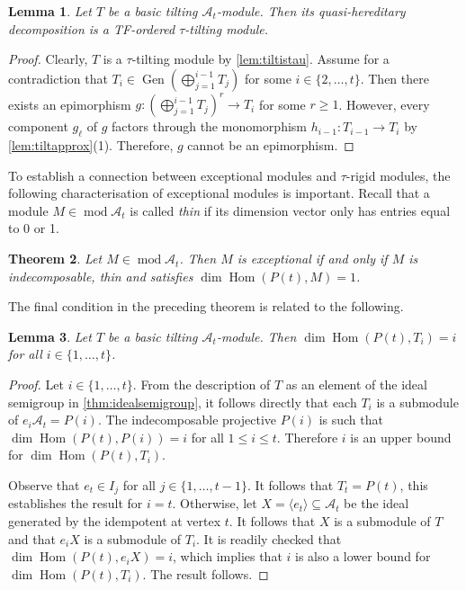 \documentclass[10pt,twoside, a4paper,reqno]{amsart}
\DeclareMathOperator{\mods}{mod}
\DeclareMathOperator{\Hom}{Hom}
\DeclareMathOperator{\Gen}{Gen}
\newcommand{\A}{\mathscr{A}}
\newtheorem{theorem}{Theorem}[section]
\newtheorem{lemma}[theorem]{Lemma}
\theoremstyle{definition}
\begin{document}
\begin{lemma}\label{lem:tfordered}
    Let $T$ be a basic tilting $\A_t$-module. Then its quasi-hereditary decomposition is a TF-ordered $\tau$-tilting module.
\end{lemma}
\begin{proof}
	Clearly, $T$ is a $\tau$-tilting module by \cref{lem:tiltistau}. Assume for a contradiction that $T_i \in \Gen(\bigoplus_{j=1}^{i-1} T_j)$ for some $i \in \{2, \dots, t\}$. Then there exists an epimorphism $g: (\bigoplus_{j=1}^{i-1} T_j)^r \to T_i$ for some $r \geq 1$. However, every component $g_\ell$ of $g$ factors through the monomorphism $h_{i-1}: T_{i-1} \to T_i$ by \cref{lem:tiltapprox}(1). Therefore, $g$ cannot be an epimorphism. 
\end{proof}

To establish a connection between exceptional modules and $\tau$-rigid modules, the following characterisation of exceptional modules is important. Recall that a module $M \in \mods \A_t$ is called \textit{thin} if its dimension vector only has entries equal to 0 or 1. 

\begin{theorem}\cite[Thm. 2.2(1)]{HillePloog2019}\label{thm:HPcharexceptional}
	Let $M \in \mods \A_t$. Then $M$ is exceptional if and only if $M$ is indecomposable, thin and satisfies $\dim \Hom(P(t),M)=1$.
\end{theorem}

The final condition in the preceding theorem is related to the following.

\begin{lemma}\label{lem:tiltdimhom}
    Let $T$ be a basic tilting $\A_t$-module. Then $\dim \Hom(P(t), T_i)=i$ for all $i \in \{1, \dots, t\}$. 
\end{lemma}
\begin{proof}
    Let $i \in \{1, \dots, t\}$. From the description of $T$ as an element of the ideal semigroup in \cref{thm:idealsemigroup}, it follows directly that each $T_i$ is a submodule of $e_i \A_t = P(i)$. The indecomposable projective $P(i)$ is such that $\dim \Hom(P(t), P(i))=i$ for all $1 \leq i \leq t$. Therefore $i$ is an upper bound for $\dim \Hom(P(t), T_i)$. 

    Observe that $e_t \in I_j$ for all $j \in \{1, \dots, t-1\}$. It follows that $T_t = P(t)$, this establishes the result for $i=t$. Otherwise, let $X = \langle e_t \rangle \subseteq \A_t$ be the ideal generated by the idempotent at vertex $t$. It follows that $X$ is a submodule of $T$ and that $e_i X$ is a submodule of $T_i$. It is readily checked that $\dim \Hom(P(t), e_iX) = i$, which implies that $i$ is also a lower bound for $\dim \Hom(P(t), T_i)$. The result follows.
\end{proof}
\end{document}
